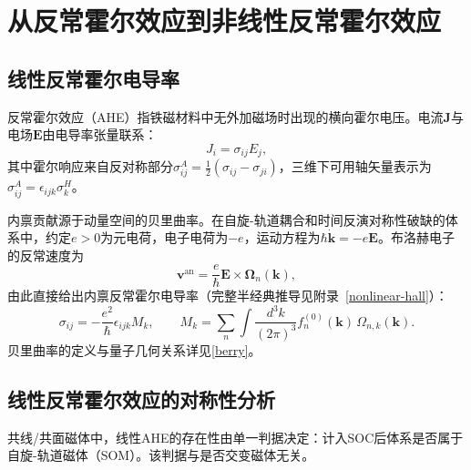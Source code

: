 
\chapter{从反常霍尔效应到非线性反常霍尔效应}

\section{线性反常霍尔电导率}
\label{sec:AHE}

反常霍尔效应（AHE）指铁磁材料中无外加磁场时出现的横向霍尔电压。电流$\mathbf{J}$与电场$\mathbf{E}$由电导率张量联系：
\begin{equation}
J_i = \sigma_{ij} E_j,
\end{equation}
其中霍尔响应来自反对称部分$\sigma_{ij}^A = \frac{1}{2}(\sigma_{ij}-\sigma_{ji})$，三维下可用轴矢量表示为$\sigma_{ij}^A = \epsilon_{ijk}\sigma_k^H$。

内禀贡献源于动量空间的贝里曲率。在自旋-轨道耦合和时间反演对称性破缺的体系中，约定$e>0$为元电荷，电子电荷为$-e$，运动方程为$\hbar\dot{\mathbf{k}}=-e\mathbf{E}$。布洛赫电子的反常速度为
\begin{equation}
\mathbf{v}^{\text{an}} = \frac{e}{\hbar}\mathbf{E}\times\bm{\Omega}_n(\mathbf{k}),
\end{equation}
由此直接给出内禀反常霍尔电导率（完整半经典推导见附录~\ref{nonlinear-hall}）：
\begin{equation}
\sigma_{ij} = -\frac{e^2}{\hbar}\epsilon_{ijk} M_k, \qquad
M_k = \sum_n \int \frac{d^3k}{(2\pi)^3} f_n^{(0)}(\mathbf{k})\,\Omega_{n,k}(\mathbf{k}).
\label{eq:AHE_sigma}
\end{equation}
贝里曲率的定义与量子几何关系详见\autoref{berry}。

\section{线性反常霍尔效应的对称性分析}
\label{sec:AM_AHE_symmetry}

共线/共面磁体中，线性AHE的存在性由单一判据决定：计入SOC后体系是否属于自旋-轨道磁体（SOM）。该判据与是否交变磁体无关。

